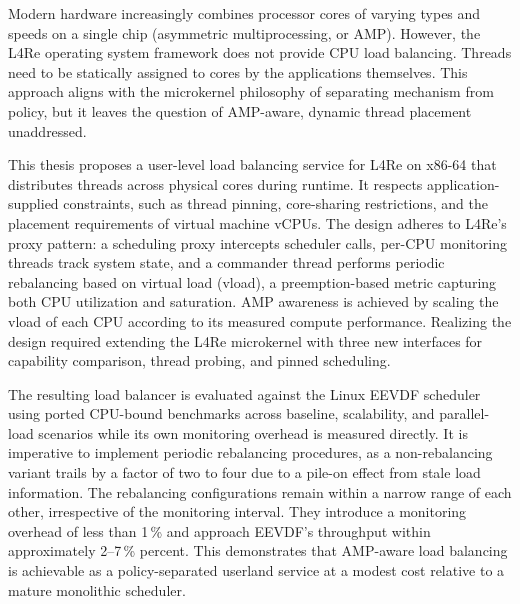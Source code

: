 


Modern hardware increasingly combines processor cores of varying types and speeds on a single chip (asymmetric multiprocessing, or AMP).
However, the L4Re operating system framework does not provide CPU load balancing.
Threads need to be statically assigned to cores by the applications themselves.
This approach aligns with the microkernel philosophy of separating mechanism from policy, but it leaves the question of AMP-aware, dynamic thread placement unaddressed.

This thesis proposes a user-level load balancing service for L4Re on x86-64 that distributes threads across physical cores during runtime.
It respects application-supplied constraints, such as thread pinning, core-sharing restrictions, and the placement requirements of virtual machine vCPUs.
The design adheres to L4Re's proxy pattern: a scheduling proxy intercepts scheduler calls, per-CPU monitoring threads track system state, and a commander thread performs periodic rebalancing based on virtual load (vload), a preemption-based metric capturing both CPU utilization and saturation.
AMP awareness is achieved by scaling the vload of each CPU according to its measured compute performance.
Realizing the design required extending the L4Re microkernel with three new interfaces for capability comparison, thread probing, and pinned scheduling.

The resulting load balancer is evaluated against the Linux EEVDF scheduler using ported CPU-bound benchmarks across baseline, scalability, and parallel-load scenarios while its own monitoring overhead is measured directly.
It is imperative to implement periodic rebalancing procedures, as a non-rebalancing variant trails by a factor of two to four due to a pile-on effect from stale load information.
The rebalancing configurations remain within a narrow range of each other, irrespective of the monitoring interval.
They introduce a monitoring overhead of less than 1\,\% and approach EEVDF's throughput within approximately 2--7\,\% percent.
This demonstrates that AMP-aware load balancing is achievable as a policy-separated userland service at a modest cost relative to a mature monolithic scheduler.



